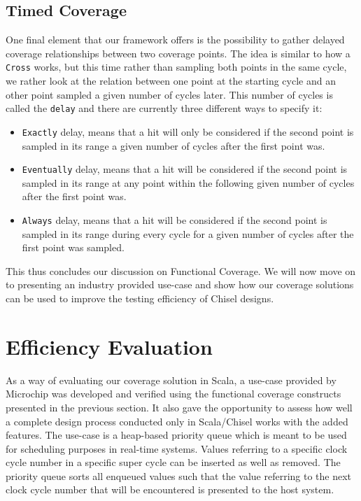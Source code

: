 \documentclass[conference]{IEEEtran}
\begin{document}
\subsection{Timed Coverage}
One final element that our framework offers is the possibility to gather delayed coverage relationships between two coverage points. The idea is similar to how a \texttt{Cross} works, but this time rather than sampling both points in the same cycle, we rather look at the relation between one point at the starting cycle and an other point sampled a given number of cycles later. This number of cycles is called the \texttt{delay} and there are currently three different ways to specify it:  
\begin{itemize}
 \item \texttt{Exactly} delay, means that a hit will only be considered if the second point is sampled in its range a given number of cycles after the first point was.
 \item \texttt{Eventually} delay, means that a hit will be considered if the second point is sampled in its range at any point within the following given number of cycles after the first point was.  
 \item \texttt{Always} delay, means that a hit will be considered if the second point is sampled in its range during every cycle for a given number of cycles after the first point was sampled.
\end{itemize}  

This thus concludes our discussion on Functional Coverage. We will now move on to presenting an industry provided use-case and show how our coverage solutions can be used to improve the testing efficiency of Chisel designs.

\section{Efficiency Evaluation}
As a way of evaluating our coverage solution in Scala, a use-case provided by Microchip was developed and verified using the functional coverage constructs presented in the previous section. It also gave the opportunity to assess how well a complete design process conducted only in Scala/Chisel works with the added features. The use-case is a heap-based priority queue which is meant to be used for scheduling purposes in real-time systems. Values referring to a specific clock cycle number in a specific super cycle can be inserted as well as removed. The priority queue sorts all enqueued values such that the value referring to the next clock cycle number that will be encountered is presented to the host system. 
\end{document}
